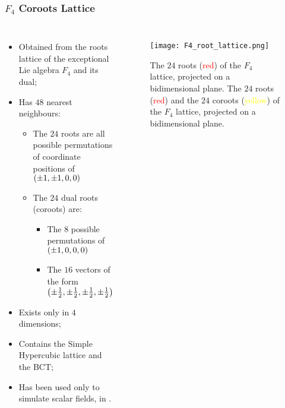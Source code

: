 \documentclass{beamer}
\begin{document}
\begin{frame}
  \frametitle{$F_4$ Coroots Lattice}
  \centering
  \begin{columns}
    \begin{itemize}
      \item[\ding{228}] Obtained from the roots lattice of the exceptional Lie algebra $F_4$ and its dual;
      \item[\ding{228}] Has $48$ nearest neighbours:
      \begin{itemize}
        \item The $24$ roots are all possible permutations of coordinate positions of $\left(\pm1,\pm1,0,0\right)$
        \vspace{0.25\baselineskip}
        \item The $24$ dual roots (coroots) are:
        \begin{itemize}
          \item[\ding{109}] The $8$ possible permutations of $\left(\pm1,0,0,0\right)$
          \item[\ding{109}] The $16$ vectors of the form $\left(\pm\frac12,\pm\frac12,\pm\frac12,\pm\frac12\right)$
        \end{itemize}
      \end{itemize}
      \item[\ding{228}] Exists only in $4$ dimensions;
      \item[\ding{228}] Contains the Simple Hypercubic lattice and the BCT;
      \item[\ding{228}] Has been used only to simulate scalar fields, in \cite{Neuberger:1987kt}.
    \end{itemize}

    \begin{figure}
      \texttt{[image: F4\_root\_lattice.png]}
      \caption{
        {The $24$ roots (\textcolor{red}{red}) of the $F_4$ lattice, projected on a bidimensional plane.\vspace{\baselineskip}}
        {The $24$ roots (\textcolor{red}{red}) and the $24$ coroots (\textcolor{yellow}{yellow}) of the $F_4$ lattice, projected on a bidimensional plane.}
      }
    \end{figure}
  \end{columns}
\end{frame}
\end{document}
